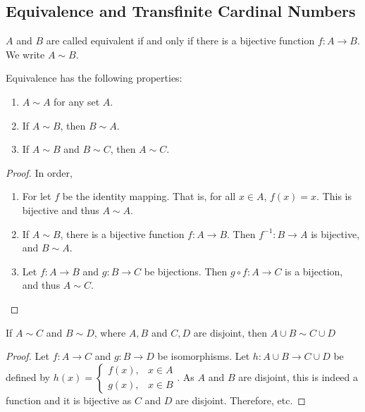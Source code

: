 \documentclass[crop=false,class=book,oneside]{standalone}
\begin{document}
        \subsection{Equivalence and Transfinite Cardinal Numbers}
            \begin{definition}
            $A$ and $B$ are called equivalent if and only if there is a bijective function $f:A\rightarrow B$. We write $A\sim B$.
            \end{definition}
            \begin{theorem}
            Equivalence has the following properties:
            \begin{enumerate}
            \item $A\sim A$ for any set $A$.
            \item If $A\sim B$, then $B\sim A$.
            \item If $A\sim B$ and $B\sim C$, then $A\sim C$.
            \end{enumerate}
            \end{theorem}
            \begin{proof}
            In order,
            \begin{enumerate}
            \item For let $f$ be the identity mapping. That is, for all $x\in A$, $f(x) = x$. This is bijective and thus $A\sim A$.
            \item If $A\sim B$, there is a bijective function $f:A\rightarrow B$. Then $f^{-1}:B\rightarrow A$ is bijective, and $B\sim A$.
            \item Let $f:A\rightarrow B$ and $g:B\rightarrow C$ be bijections. Then $g\circ f:A\rightarrow C$ is a bijection, and thus $A\sim C$.
            \end{enumerate}
            \end{proof}
            \begin{theorem}
            If $A\sim C$ and $B\sim D$, where $A,B$ and $C,D$ are disjoint, then $A\cup B \sim C\cup D$
            \end{theorem}
            \begin{proof}
            Let $f:A\rightarrow C$ and $g:B\rightarrow D$ be isomorphisms. Let $h:A\cup B \rightarrow C\cup D$ be defined by $h(x) = \begin{cases} f(x), & x\in A\\ g(x), & x\in B\end{cases}$. As $A$ and $B$ are disjoint, this is indeed a function and it is bijective as $C$ and $D$ are disjoint. Therefore, etc.
            \end{proof}
\end{document}

